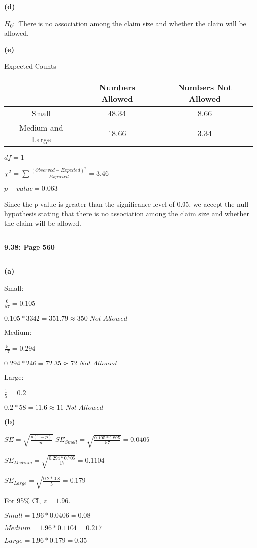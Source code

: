 \documentclass[11pt]{article}
\newcommand\question[2]{\vspace{.25in}\hrule\textbf{#1: #2}\vspace{.5em}\hrule\vspace{.10in}}
\renewcommand\part[1]{\vspace{.10in}\textbf{(#1)}\par}
\begin{document}
	\part{d}
		$H_{0}:$ There is no association among the claim size and whether the claim will be allowed.\par
		
	\part{e}
		Expected Counts\par
		\begin{tabular}{|c|c|c|}
			\hline
			 & Numbers Allowed & Numbers Not Allowed\\
			\hline
			Small & 48.34 & 8.66\\
			\hline
			Medium and Large & 18.66 & 3.34\\
			\hline
		\end{tabular} \par
		
		$df = 1$\par
		
		$\chi^{2} = \sum \frac{(Observed-Expected)^{2}}{Expected} = 3.46$\par
		$p-value = 0.063$\par
		Since the p-value is greater than the significance level of 0.05, we accept the null hypothesis stating that there is no association among the claim size and whether the claim will be allowed.\pagebreak
		

\question{9.38}{Page 560}
	\part{a}
		Small: \par
		$\frac{6}{57}=0.105$\par
		$0.105 * 3342 = 351.79 \approx 350 \; Not \; Allowed$\par
		
		Medium: \par
		$\frac{5}{17}=0.294$\par
		$0.294 * 246 = 72.35 \approx 72 \; Not \; Allowed$\par
		
		Large: \par
		$\frac{1}{5} = 0.2$\par
		$0.2*58 = 11.6 \approx 11 \; Not \; Allowed$\par
	\part{b}
		$SE = \sqrt{\frac{p(1-p)}{n}}$
		$SE_{Small}=\sqrt{\frac{0.105 * 0.895}{57}}=0.0406$\par
		$SE_{Medium}=\sqrt{\frac{0.294 * 0.706}{17}}= 0.1104$\par
		$SE_{Large}= \sqrt{\frac{0.2 * 0.8}{5}}=0.179$\par
		For 95\% CI, $z=1.96$.\par
		$Small=1.96 * 0.0406 = 0.08$\par
		$Medium=1.96*0.1104=0.217$\par
		$Large= 1.96*0.179=0.35$
	
\end{document}
